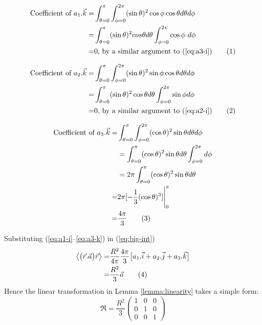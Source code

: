 \documentclass[]{article}
\newcommand\numberthis{\addtocounter{equation}{1}\tag{\theequation}}
\begin{document}
\begin{align*}
\text{Coefficient of }a_1.\vec{k} =&\int_{\theta=0}^{\pi}\int_{\phi=0}^{2\pi}(\sin\theta)^2\cos\phi\cos\theta d\theta d\phi\\=&
\int_{\theta=0}^{\pi}  (\sin\theta)^2 cos\theta d\theta \int_{\phi=0}^{2\pi}\cos\phi\ d\phi\\
=&0 \text{, by a similar argument to (\ref{eq:a3-i})} \numberthis \label{eq:a1-k}
\end{align*}

\begin{align*}
\text{Coefficient of }a_2.\vec{k} =&\int_{\theta=0}^{\pi}\int_{\phi=0}^{2\pi}(\sin\theta)^2\sin\phi\cos\theta d\theta d\phi\\=&
\int_{\theta=0}^{\pi} (\sin\theta)^2 \cos\theta d\theta \int_{\phi=0}^{2\pi}\sin\phi d\phi\\=&0 \text{, by a similar argument to (\ref{eq:a2-i})} \numberthis \label{eq:a2-k}
\end{align*}

\begin{align*}
\text{Coefficient of }a_3.\vec{k} =&\int_{\theta=0}^{\pi} \int_{\phi=0}^{2\pi} (\cos\theta)^2\sin\theta d\theta   d\phi\\ &= \int_{\theta=0}^{\pi} (\cos\theta)^2\sin\theta d\theta  \int_{\phi=0}^{2\pi} d\phi \\ &= 2 \pi \int_{\theta=0}^{\pi} (\cos\theta)^2\sin\theta d\theta \\
=& 2\pi[-\frac{1}{3}(\cos\theta)^3] \Bigg|_0^{\pi} \\
=& \frac{4\pi}{3}\numberthis \label{eq:a3-k}
\end{align*}

Substituting (\ref{eq:a1-i}--\ref{eq:a3-k})  in (\ref{eq:big-int})
\begin{align*}
\left\langle \big(\vec{r}.\vec{a}\big)\vec{r} \right\rangle=&\frac{ R^2}{4\pi}\frac{4\pi}{3}\big[a_1.\vec{i}+a_2.\vec{j}+a_3.\vec{k}\big]\\
=&\frac{R^2}{3}\vec{a} \numberthis \label{eq:final}
\end{align*}
Hence the linear transformation in Lemma \ref{lemma:linearity}  takes a simple form:
\[\mathfrak{R}= \frac{R^2}{3}
\begin{pmatrix}
1 & 0 & 0 \\
0 & 1 & 0 \\
0 & 0 & 1
\end{pmatrix}
\]
\end{document}
